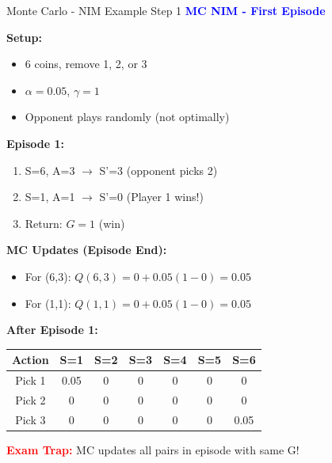 \documentclass[8pt]{beamer}
\begin{document}
\begin{frame}{Monte Carlo - NIM Example Step 1}
\fontsize{6.5}{7.5}\selectfont
\textcolor{blue}{\textbf{MC NIM - First Episode}}

\textbf{Setup:}
\begin{itemize}
\item 6 coins, remove 1, 2, or 3
\item $\alpha = 0.05$, $\gamma = 1$
\item Opponent plays randomly (not optimally)
\end{itemize}

\textbf{Episode 1:}
\begin{enumerate}
\item S=6, A=3 $\rightarrow$ S'=3 (opponent picks 2)
\item S=1, A=1 $\rightarrow$ S'=0 (Player 1 wins!)
\item Return: $G = 1$ (win)
\end{enumerate}

\textbf{MC Updates (Episode End):}
\begin{itemize}
\item For (6,3): $Q(6,3) = 0 + 0.05(1 - 0) = 0.05$
\item For (1,1): $Q(1,1) = 0 + 0.05(1 - 0) = 0.05$
\end{itemize}

\textbf{After Episode 1:}
\begin{tabular}{|c|c|c|c|c|c|c|}
\hline
Action & S=1 & S=2 & S=3 & S=4 & S=5 & S=6 \\
\hline
Pick 1 & 0.05 & 0 & 0 & 0 & 0 & 0 \\
\hline
Pick 2 & 0 & 0 & 0 & 0 & 0 & 0 \\
\hline
Pick 3 & 0 & 0 & 0 & 0 & 0 & 0.05 \\
\hline
\end{tabular}

\textcolor{red}{\textbf{Exam Trap:}} MC updates all pairs in episode with same G!
\end{frame}
\end{document}
